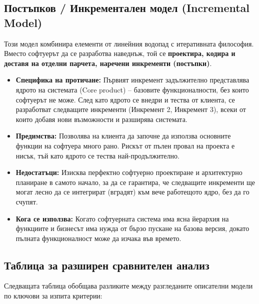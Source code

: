 \documentclass{scrartcl}
\begin{document}
\begin{FlushLeft}
\subsection{Постъпков / Инкрементален модел (Incremental Model)}
Този модел комбинира елементи от линейния водопад с итеративната философия. Вместо софтуерът да се разработва наведнъж, той се \textbf{проектира, кодира и доставя на отделни парчета, наречени инкременти (постъпки)}.
\begin{itemize}
    \item \textbf{Специфика на протичане:} Първият инкремент задължително представлява ядрото на системата (Core product) – базовите функционалности, без които софтуерът не може. След като ядрото се внедри и тества от клиента, се разработват следващите инкременти (Инкремент 2, Инкремент 3), всеки от които добавя нови възможности и разширява системата.
    \item \textbf{Предимства:} Позволява на клиента да започне да използва основните функции на софтуера много рано. Рискът от пълен провал на проекта е нисък, тъй като ядрото се тества най-продължително.
    \item \textbf{Недостатъци:} Изисква перфектно софтуерно проектиране и архитектурно планиране в самото начало, за да се гарантира, че следващите инкременти ще могат лесно да се интегрират (вградят) към вече работещото ядро, без да го счупят.
    \item \textbf{Кога се използва:} Когато софтуерната система има ясна йерархия на функциите и бизнесът има нужда от бързо пускане на базова версия, докато пълната функционалност може да изчака във времето.
\end{itemize}

\subsection{Таблица за разширен сравнителен анализ}
Следващата таблица обобщава разликите между разгледаните описателни модели по ключови за изпита критерии:


\end{FlushLeft}
\end{document}
